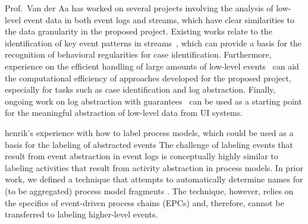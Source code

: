 Prof.\ Van der Aa has worked on several projects involving the analysis of low-level event data in both event logs and streams, which have clear similarities to the data granularity in the proposed project.
Existing works relate to the identification of key event patterns in streams~\cite{cepchapter}, which can provide a basis for the recognition of behavioral regularities for case identification.
Furthermore, experience on the efficient handling of large amounts of low-level events~\cite{sigmodpaper} can aid the computational efficiency of approaches developed for the proposed project, especially for tasks such as case identification and log abstraction.
Finally, ongoing work on log abstraction with guarantees~\cite{icdesubmission} can be used as a starting point for the meaningful abstraction of low-level data from UI systems.

 henrik's experience with how to label process models, which could be used as a basis for the labeling of abstracted events
 The challenge of labeling events that result from event abstraction in event logs is conceptually highly similar to labeling activities that result from activity abstraction in process models. In prior work, we defined a technique that attempts to automatically determine names for (to be aggregated) process model fragments \cite{leopold2014simplifying}. The technique, however, relies on the specifics of event-driven process chains (EPCs) and, therefore, cannot be transferred to labeling higher-level events. 


